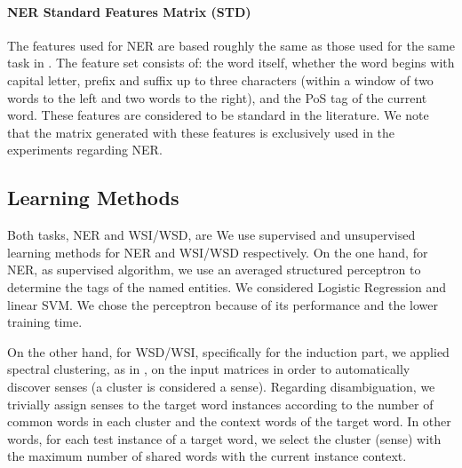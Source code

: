 \documentclass[11pt]{article}
\begin{document}
\paragraph{NER Standard Features Matrix (STD)}

The features used for NER are based roughly the same as those used for the same task in \cite{Daume2006,Balasuriya2009}. The feature set consists of: the word itself, whether the word begins with capital letter, prefix and suffix up to three characters (within a window of two words to the left and two words to the right), and the PoS tag of the current word. These features are considered to be standard in the literature. We note that the matrix generated with these features is exclusively used in the experiments regarding NER.	

\subsection{Learning Methods}
Both tasks, NER and WSI/WSD, are
We use supervised and unsupervised learning methods for NER and WSI/WSD respectively. On the one hand, for NER, as supervised algorithm, we use an averaged structured perceptron \cite{Collins2002,Daume2006} to determine the tags of the named entities. We considered Logistic Regression and linear SVM. We chose the perceptron because of its performance and the lower training time.

On the other hand, for WSD/WSI, specifically for the induction part, we applied spectral clustering, as in  \cite{GoyalH14}, on the input matrices in order to automatically discover senses (a cluster is considered a sense). Regarding disambiguation, we trivially assign senses to the target word instances according to the number of common words in each cluster and the context words of the target word. In other words, for each test instance of a target word, we select the cluster (sense) with the maximum number of shared words with the current instance context.


\end{document}
